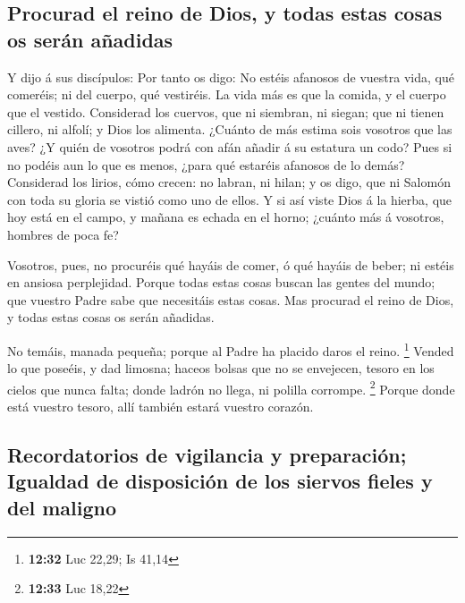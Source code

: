 \hypertarget{procurad-el-reino-de-dios-y-todas-estas-cosas-os-seruxe1n-auxf1adidas}{%
\subsection{Procurad el reino de Dios, y todas estas cosas os serán
añadidas}\label{procurad-el-reino-de-dios-y-todas-estas-cosas-os-seruxe1n-auxf1adidas}}

 Y dijo á sus discípulos: Por tanto os digo: No estéis
afanosos de vuestra vida, qué comeréis; ni del cuerpo, qué vestiréis.
 La vida más es que la comida, y el cuerpo que el vestido.
 Considerad los cuervos, que ni siembran, ni siegan; que ni
tienen cillero, ni alfolí; y Dios los alimenta. ¿Cuánto de más estima
sois vosotros que las aves?  ¿Y quién de vosotros podrá con
afán añadir á su estatura un codo?  Pues si no podéis aun
lo que es menos, ¿para qué estaréis afanosos de lo demás? 
Considerad los lirios, cómo crecen: no labran, ni hilan; y os digo, que
ni Salomón con toda su gloria se vistió como uno de ellos. 
Y si así viste Dios á la hierba, que hoy está en el campo, y mañana es
echada en el horno; ¿cuánto más á vosotros, hombres de poca fe?

 Vosotros, pues, no procuréis qué hayáis de comer, ó qué
hayáis de beber; ni estéis en ansiosa perplejidad.  Porque
todas estas cosas buscan las gentes del mundo; que vuestro Padre sabe
que necesitáis estas cosas.  Mas procurad el reino de Dios,
y todas estas cosas os serán añadidas.

 No temáis, manada pequeña; porque al Padre ha placido
daros el reino. \footnote{\textbf{12:32} Luc 22,29; Is 41,14}
 Vended lo que poseéis, y dad limosna; haceos bolsas que no
se envejecen, tesoro en los cielos que nunca falta; donde ladrón no
llega, ni polilla corrompe. \footnote{\textbf{12:33} Luc 18,22}
 Porque donde está vuestro tesoro, allí también estará
vuestro corazón.

\hypertarget{recordatorios-de-vigilancia-y-preparaciuxf3n-igualdad-de-disposiciuxf3n-de-los-siervos-fieles-y-del-maligno}{%
\subsection{Recordatorios de vigilancia y preparación; Igualdad de
disposición de los siervos fieles y del
maligno}\label{recordatorios-de-vigilancia-y-preparaciuxf3n-igualdad-de-disposiciuxf3n-de-los-siervos-fieles-y-del-maligno}}

